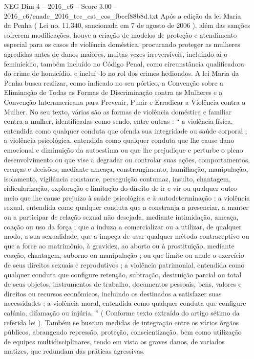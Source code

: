 \begin{textsample}{NEG Dim 4 – 2016\_c6 – Score 3.00 – 2016\_c6/enade\_2016\_tec\_est\_cos\_fbccf88b8d.txt}
Após a edição da lei Maria da Penha ( Lei no. 11.340, sancionada em 7 de agosto de 2006 ), além das sanções sofrerem modificações, houve a criação de modelos de proteção e atendimento especial para os casos de violência doméstica, procurando proteger as mulheres agredidas antes de danos maiores, muitas vezes irreversíveis, incluindo aí o feminicídio, também incluído no Código Penal, como circunstância qualificadora do crime de homicídio, e incluí -lo no rol dos crimes hediondos.
A lei Maria da Penha busca realizar, como indicado no seu pórtico, a Convenção sobre a Eliminação de Todas as Formas de Discriminação contra as Mulheres e a Convenção Interamericana para Prevenir, Punir e Erradicar a Violência contra a Mulher.
No seu texto, várias são as formas de violência doméstica e familiar contra a mulher, identificadas como sendo, entre outras : “ a violência física, entendida como qualquer conduta que ofenda sua integridade ou saúde corporal ; a violência psicológica, entendida como qualquer conduta que lhe cause dano emocional e diminuição da autoestima ou que lhe prejudique e perturbe o pleno desenvolvimento ou que vise a degradar ou controlar suas ações, comportamentos, crenças e decisões, mediante ameaça, constrangimento, humilhação, manipulação, isolamento, vigilância constante, perseguição contumaz, insulto, chantagem, ridicularização, exploração e limitação do direito de ir e vir ou qualquer outro meio que lhe cause prejuízo à saúde psicológica e à autodeterminação ; a violência sexual, entendida como qualquer conduta que a constranja a presenciar, a manter ou a participar de relação sexual não desejada, mediante intimidação, ameaça, coação ou uso da força ; que a induza a comercializar ou a utilizar, de qualquer modo, a sua sexualidade, que a impeça de usar qualquer método contraceptivo ou que a force ao matrimônio, à gravidez, ao aborto ou à prostituição, mediante coação, chantagem, suborno ou manipulação ; ou que limite ou anule o exercício de seus direitos sexuais e reprodutivos ; a violência patrimonial, entendida como qualquer conduta que configure retenção, subtração, destruição parcial ou total de seus objetos, instrumentos de trabalho, documentos pessoais, bens, valores e direitos ou recursos econômicos, incluindo os destinados a satisfazer suas necessidades ; a violência moral, entendida como qualquer conduta que configure calúnia, difamação ou injúria. ” ( Conforme texto extraído do artigo sétimo da referida lei ).
Também se buscam medidas de integração entre os vários órgãos públicos, abrangendo repressão, proteção, conscientização, bem como utilização de equipes multidisciplinares, tendo em vista os graves danos, de variados matizes, que redundam das práticas agressivas.

\end{textsample}
